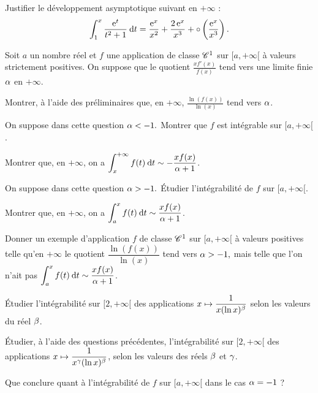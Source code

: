 \documentclass[oneside,11pt]{book}
\begin{document}
\begin{probleme*}
\qu Justifier le développement asymptotique suivant en $+\infty$ :
\[
\displaystyle \int_1^x \frac{\operatorname{e}^t}{t^2+1} \:{\text d}t = \frac{\operatorname{e}^x}{x^2} + \frac{2\operatorname{e}^x}{x^3} + \circ\left(\frac{\operatorname{e}^x}{x^3}\right).
\]
	
\partie{}
Soit $a$ un nombre réel et $f$ une application de classe $\mathscr{C}^1$ sur $[a,+\infty[$ à valeurs strictement positives. On suppose que le quotient $\frac{x f'(x)}{f(x)}$ tend vers une limite finie $\alpha$ en $+\infty.$

\qu Montrer, à l'aide des préliminaires que, en $+\infty$, $\frac{\ln(f(x))}{\ln(x)}$ tend vers $\alpha$.

\qu On suppose dans cette question $\alpha < -1.$
\squ Montrer que $f$ est intégrable sur $[a,+\infty[$.

\squ Montrer que, en $+\infty$, on a $\displaystyle \int_x^{+\infty} f(t) \:{\text d}t \sim -\frac{x f(x)}{\alpha + 1}$.

\qu On suppose dans cette question $\alpha > -1.$
\squ Étudier l'intégrabilité de $f$ sur $[a,+\infty[.$

\squ Montrer que, en $+\infty$, on a $\displaystyle \int_a^{x} f(t) \:{\text d}t \sim \frac{x f(x)}{\alpha + 1}$.

\squ Donner un exemple d'application $f$ de classe $\mathscr{C}^1$ sur $[a, +\infty[$ à valeurs positives telle qu'en $+\infty$ le quotient $\dfrac{\ln(f(x))}{\ln(x)}$ tend vers $\alpha > -1,$ mais telle que l'on n'ait pas $\displaystyle \int_a^{x} f(t) \:{\text d}t \sim \frac{x f(x)}{\alpha+1}$.

\Qu Étudier l'intégrabilité sur $[2,+\infty[$ des applications $ x \mapsto \dfrac{1}{x (\ln x)^{\beta}}$ selon les valeurs du réel $\beta$.

\squ Étudier, à l'aide des questions précédentes, l'intégrabilité sur $[2,+\infty[$ des applications $x \mapsto \dfrac{1}{x^{\gamma}(\ln x)^{\beta}}$, selon les valeurs des réels $\beta$ et $\gamma$.

\squ Que conclure quant à l'intégrabilité de $f$ sur $[a,+\infty[$ dans le cas $\alpha =-1$ ?
\end{probleme*}
\end{document}
